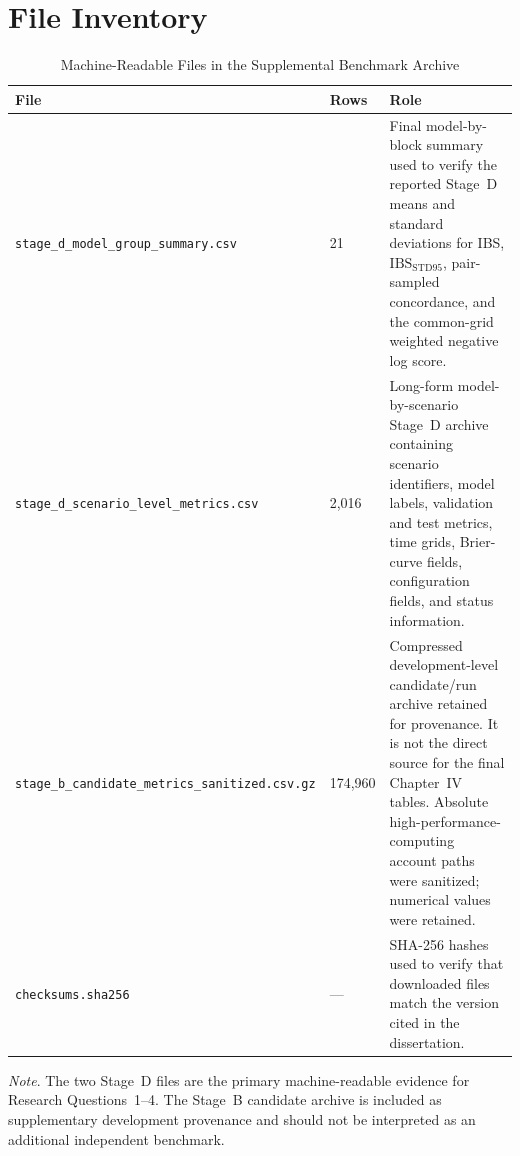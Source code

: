 \section{File Inventory}

\begin{table}[htbp]
\raggedright
\caption[Machine-readable files in the supplemental benchmark archive]
{Machine-Readable Files in the Supplemental Benchmark Archive}
\label{tab:appendix-b-file-inventory}
\begin{threeparttable}
\small
\renewcommand{\arraystretch}{1.14}
\begin{tabularx}{\textwidth}{@{}L{4.4cm}L{1.5cm}Y@{}}
\toprule
\textbf{File} & \textbf{Rows} & \textbf{Role} \\
\midrule
\texttt{stage\_d\_model\_group\_summary.csv}
& 21
& Final model-by-block summary used to verify the reported Stage~D means and standard
deviations for IBS, \(\mathrm{IBS}_{\mathrm{STD95}}\), pair-sampled concordance, and the
common-grid weighted negative log score. \\

\texttt{stage\_d\_scenario\_level\_metrics.csv}
& 2,016
& Long-form model-by-scenario Stage~D archive containing scenario identifiers, model labels,
validation and test metrics, time grids, Brier-curve fields, configuration fields, and status
information. \\

\texttt{stage\_b\_candidate\_metrics\_sanitized.csv.gz}
& 174,960
& Compressed development-level candidate/run archive retained for provenance. It is not the
direct source for the final Chapter~IV tables. Absolute high-performance-computing account
paths were sanitized; numerical values were retained. \\

\texttt{checksums.sha256}
& ---
& SHA-256 hashes used to verify that downloaded files match the version cited in the
dissertation. \\
\bottomrule
\end{tabularx}
\begin{tablenotes}[flushleft]
\footnotesize
\item \textit{Note}. The two Stage~D files are the primary machine-readable evidence for
Research Questions~1--4. The Stage~B candidate archive is included as supplementary
development provenance and should not be interpreted as an additional independent benchmark.
\end{tablenotes}
\end{threeparttable}
\end{table}

